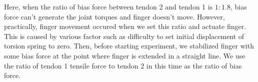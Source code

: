 \documentclass{llncs}
\begin{document}
Here, when the ratio of bias force between tendon 2 and tendon 1 is $1:1.8$, 
bias force can't generate the joint torques and 
finger doesn't move.
However, practically, finger movement occured when we set this ratio and actuate finger.
This is caused by various factor such as difficulty to set initial displacement of torsion spring to zero.
Then, before starting experiment, we stabilized finger with some bias force at the point where finger is extended in a straight line.
We use the ratio of tendon 1 tensile force to tendon 2 in this time as the ratio of bias force. 


\end{document}
